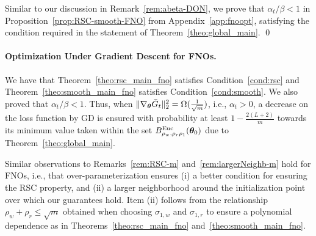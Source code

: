 \begin{remark} 
Similar to our discussion in Remark~\ref{rem:abeta-DON}, we prove that 
$\alpha_t/\beta<1$ in Proposition~\ref{prop:RSC-smooth-FNO} from Appendix~\ref{app:fnoopt}, satisfying the condition required in the statement of Theorem~\ref{theo:global_main}.
%
%
\qed
\end{remark}

\paragraph{\textbf{Optimization Under Gradient Descent for FNOs.}} 
We have that 
Theorem~\ref{theo:rsc_main_fno} satisfies Condition~\ref{cond:rsc} and Theorem~\ref{theo:smooth_main_fno} satisfies Condition~\ref{cond:smooth}. We also proved that $\alpha_t/\beta<1$. Thus, when $\| \nabla_{{\bm{\theta}}} \bar{G}_t \|_2^2 = \Omega(\frac{1}{\sqrt{m}})$, i.e., $\alpha_t>0$, a decrease on the loss function by GD is ensured with probability at least $1- \frac{2(L+2)}{m}$ towards its minimum value taken within the set $B^{\mathrm{Euc}}_{\rho_w,\rho_r\rho_1}({\bm{\theta}}_0)$ due to Theorem~\ref{theo:global_main}.
%
%

\begin{remark}
Similar observations to Remarks~\ref{rem:RSC-m} and~\ref{rem:largerNeighb-m} hold for FNOs, i.e., that over-parameterization ensures (i) a better condition for ensuring the RSC property, and (ii) a larger neighborhood %
around the initialization point over which our guarantees hold. Item (ii) follows from the relationship $\rho_w+\rho_r\leq \sqrt{m}$ obtained when choosing $\sigma_{1,w}$ and $\sigma_{1,r}$ to ensure a polynomial dependence as in Theorems~\ref{theo:rsc_main_fno} and~\ref{theo:smooth_main_fno}.
%
\end{remark}